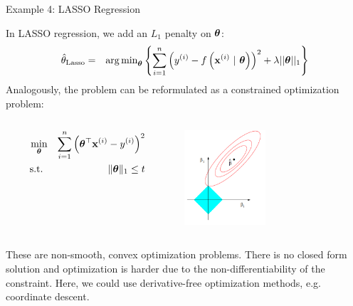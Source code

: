 \begin{frame}{Example 4: LASSO Regression}
	
	In LASSO regression, we add an $L_1$ penalty on $\bm{\theta}$:
	\vspace*{-0.1cm}
	\begin{eqnarray*}
		\hat{\theta}_{\text{Lasso}} &=&  \operatorname{arg\,min}_{\bm{\theta}} \left\{ \sum\limits_{i=1}^n \left(y^{(i)} - f\left(\mathbf{x}^{(i)} ~|~ \bm{\theta}\right)\right)^2 + \lambda ||\bm{\theta}||_1 \right\} 
	\end{eqnarray*}
	Analogously, the problem can be reformulated as a constrained optimization problem:
	\vspace*{-0.2cm}
	\begin{columns}[T] %
		\begin{column}{.48\textwidth}
			\begin{eqnarray*}
				\min_{\bm{\theta}} && \sum_{i = 1}^n \left(\bm{\theta}^\top \mathbf{x}^{(i)} - y^{(i)}\right)^2 \\
				\text{s.t. } && \|\bm{\theta}\|_1 \le t
			\end{eqnarray*}
		\end{column}

		\begin{column}{.48\textwidth}
			\begin{center}
				\includegraphics[width=0.45\textwidth, keepaspectratio]{figure_man/lasso.png} 
			\end{center}
		\end{column}
	\end{columns}	

		\pause
These are non-smooth, convex optimization problems. There is no closed form solution and optimization is harder due to the non-differentiability of the constraint. Here, we could use derivative-free optimization methods, e.g. coordinate descent. 	

\end{frame}

